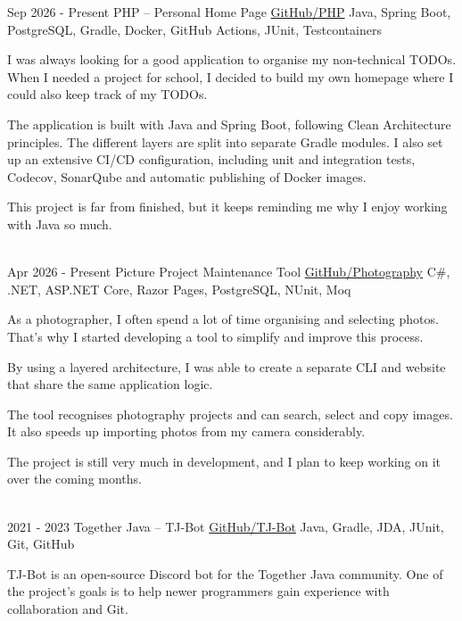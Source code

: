 \documentclass[letterpaper]{twentysecondcv_english}
\begin{document}
    \begin{twenty}

        \twentyitem
        {Sep 2026 -}
        {Present}
        {PHP -- Personal Home Page}
        {\href{https://github.com/Tais993/PHP}{GitHub/PHP}}
        {Java, Spring Boot, PostgreSQL, Gradle, Docker, GitHub Actions, JUnit, Testcontainers}
        {
            I was always looking for a good application to organise my
            non-technical TODOs. When I needed a project for school,
            I decided to build my own homepage where I could also
            keep track of my TODOs.

            The application is built with Java and Spring Boot, following
        Clean Architecture principles. The different layers are split
        into separate Gradle modules. I also set up an extensive CI/CD
        configuration, including unit and integration tests, Codecov,
            SonarQube and automatic publishing of Docker images.

            This project is far from finished, but it keeps reminding me
        why I enjoy working with Java so much.
        } \\

        \twentyitem
        {Apr 2026 -}
        {Present}
        {Picture Project Maintenance Tool}
        {\href{https://github.com/Tais993/Photography}{GitHub/Photography}}
        {C\#, .NET, ASP.NET Core, Razor Pages, PostgreSQL, NUnit, Moq}
        {
            As a photographer, I often spend a lot of time organising
        and selecting photos. That's why I started developing a tool
        to simplify and improve this process.

        By using a layered architecture, I was able to create a
        separate CLI and website that share the same application logic.

        The tool recognises photography projects and can search,
            select and copy images. It also speeds up importing photos
            from my camera considerably.

            The project is still very much in development, and I plan to
        keep working on it over the coming months.
        } \\

        \twentyitem
        {2021 -}
        {2023}
        {Together Java -- TJ-Bot}
        {\href{https://github.com/Together-Java/TJ-Bot}{GitHub/TJ-Bot}}
        {Java, Gradle, JDA, JUnit, Git, GitHub}
        {
            TJ-Bot is an open-source Discord bot for the Together Java
            community. One of the project's goals is to help newer
            programmers gain experience with collaboration and Git.

}
\end{twenty}
\end{document}
